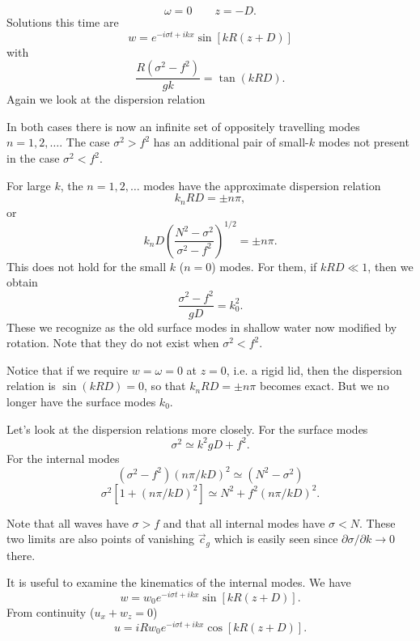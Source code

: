 \sourcepagebreak

\[
	\omega=0\qquad z=-D.
\]
Solutions this time are
\[
	w=e^{-i\sigma t+ikx}\sin[kR(z+D)]
\]
with
\[
	\frac{R(\sigma^2-f^2)}{gk}=\tan(kRD).
\]
Again we look at the dispersion relation


In both cases there is now an infinite set of oppositely travelling modes $n=1,2,\ldots$. The
case $\sigma^2>f^2$ has an additional pair of small-$k$ modes not present in the case $\sigma^2<f^2$.

For large $k$, the $n=1,2,\ldots$ modes have the approximate dispersion relation
\[
	k_nRD=\pm n\pi,
\]
or
\[
	k_nD\left(\frac{N^2-\sigma^2}{\sigma^2-f^2}\right)^{1/2}=\pm n\pi.
\]
This does not hold for the small $k$ ($n=0$) modes. For them, if $kRD\ll1$, then we
obtain
\[
	\frac{\sigma^2-f^2}{gD}=k_0^2.
\]
These we recognize as the old surface modes in shallow water now modified by
rotation. Note that they do not exist when $\sigma^2<f^2$.

\sourcepagebreak

Notice that if we require $w=\omega=0$ at $z=0$, i.e. a rigid lid, then the dispersion
relation is $\sin(kRD)=0$, so that $k_nRD=\pm n\pi$ becomes exact. But we no longer have
the surface modes $k_0$.

Let's look at the dispersion relations more closely. For the surface modes
\[
	\sigma^2\simeq k^2gD+f^2.
\]
For the internal modes
\[
	(\sigma^2-f^2)(n\pi/kD)^2\simeq(N^2-\sigma^2)
\]
\[
	\sigma^2[1+(n\pi/kD)^2]\simeq N^2+f^2(n\pi/kD)^2.
\]


Note that all waves have $\sigma>f$ and that all internal modes have $\sigma<N$. These two
limits are also points of vanishing $\vec c_g$ which is easily seen since $\partial\sigma/\partial k\to0$ there.

It is useful to examine the kinematics of the internal modes. We have
\[
	w=w_0e^{-i\sigma t+ikx}\sin[kR(z+D)].
\]
From continuity ($u_x+w_z=0$)
\[
	u=iRw_0e^{-i\sigma t+ikx}\cos[kR(z+D)].
\]


